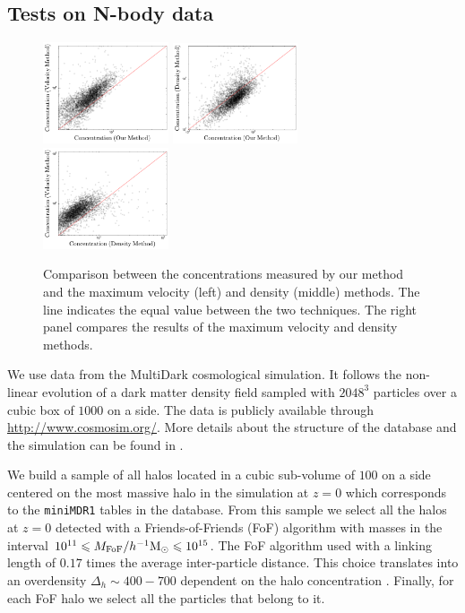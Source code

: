 \documentclass[useAMS,usenatbib]{mn2e}
\newcommand{\hMpc}{{\ifmmode{h^{-1}{\rm Mpc}}\else{$h^{-1}$Mpc }\fi}}
\newcommand{\hMsun}{{\ifmmode{h^{-1}{\rm
        {M_{\odot}}}}\else{$h^{-1}{\rm{M_{\odot}}}$~}\fi}}
\begin{document}
\subsection{Tests on N-body data}
\label{sec:data}
\begin{figure}
  \begin{center}
    \includegraphics[width=0.33\textwidth]{mass-velocity.pdf}
    \includegraphics[width=0.33\textwidth]{mass-density.pdf}
    \includegraphics[width=0.33\textwidth]{density-velocity.pdf}
  \end{center}
  \caption{Comparison between the concentrations measured by our
    method and the maximum velocity (left) and density (middle)
    methods. The line indicates the equal value between the two
    techniques. The right panel compares the results of the maximum
    velocity and density methods.
  \label{fig:mdv}}
\end{figure}

We use data from the MultiDark cosmological simulation.
It follows the non-linear evolution of a dark matter density field
sampled with $2048^3$ particles over a cubic box of $1000$ \hMpc on a side.
The data is publicly available through \url{http://www.cosmosim.org/}.
More details about the structure of the database and the simulation
can be found in \citep{2013AN....334..691R}.

We build a sample of all halos located in a cubic sub-volume of $100$
\hMpc on a side centered on the most massive halo in the simulation at
$z=0$ which corresponds to the \texttt{miniMDR1} tables in the
database.
From this sample we select all the halos at $z=0$ detected with a
Friends-of-Friends (FoF) algorithm with masses in the interval
$10^{11}\leq M_{\rm FoF}/\hMsun \leq 10^{15}$.
The FoF algorithm used with a linking length of $0.17$ times the average
inter-particle distance. This choice translates into an overdensity
$\Delta_h\sim 400-700$ dependent on the halo concentration
\citep{More2011}.
Finally, for each FoF halo we select all the particles that
belong to it.
\end{document}
